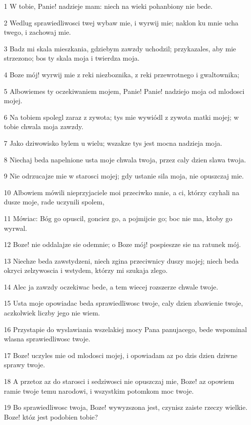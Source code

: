 \par 1 W tobie, Panie! nadzieje mam: niech na wieki pohanbiony nie bede.
\par 2 Wedlug sprawiedliwosci twej wybaw mie, i wyrwij mie; naklon ku mnie ucha twego, i zachowaj mie.
\par 3 Badz mi skala mieszkania, gdziebym zawzdy uchodzil; przykazales, aby mie strzezono; bos ty skala moja i twierdza moja.
\par 4 Boze mój! wyrwij mie z reki niezboznika, z reki przewrotnego i gwaltownika;
\par 5 Albowiemes ty oczekiwaniem mojem, Panie! Panie! nadziejo moja od mlodosci mojej.
\par 6 Na tobiem spolegl zaraz z zywota; tys mie wywiódl z zywota matki mojej; w tobie chwala moja zawzdy.
\par 7 Jako dziwowisko bylem u wielu; wszakze tys jest mocna nadzieja moja.
\par 8 Niechaj beda napelnione usta moje chwala twoja, przez caly dzien slawa twoja.
\par 9 Nie odrzucajze mie w starosci mojej; gdy ustanie sila moja, nie opuszczaj mie.
\par 10 Albowiem mówili nieprzyjaciele moi przeciwko mnie, a ci, którzy czyhali na dusze moje, rade uczynili spolem,
\par 11 Mówiac: Bóg go opuscil, gonciez go, a pojmijcie go; boc nie ma, ktoby go wyrwal.
\par 12 Boze! nie oddalajze sie odemnie; o Boze mój! pospieszze sie na ratunek mój.
\par 13 Niechze beda zawstydzeni, niech zgina przeciwnicy duszy mojej; niech beda okryci zelzywoscia i wstydem, którzy mi szukaja zlego.
\par 14 Alec ja zawzdy oczekiwac bede, a tem wiecej rozszerze chwale twoje.
\par 15 Usta moje opowiadac beda sprawiedliwosc twoje, caly dzien zbawienie twoje, aczkolwiek liczby jego nie wiem.
\par 16 Przystapie do wyslawiania wszelakiej mocy Pana panujacego, bede wspominal wlasna sprawiedliwosc twoje.
\par 17 Boze! uczyles mie od mlodosci mojej, i opowiadam az po dzis dzien dziwne sprawy twoje.
\par 18 A przetoz az do starosci i sedziwosci nie opuszczaj mie, Boze! az opowiem ramie twoje temu narodowi, i wszystkim potomkom moc twoje.
\par 19 Bo sprawiedliwosc twoja, Boze! wywyzszona jest, czynisz zaiste rzeczy wielkie. Boze! któz jest podobien tobie?
